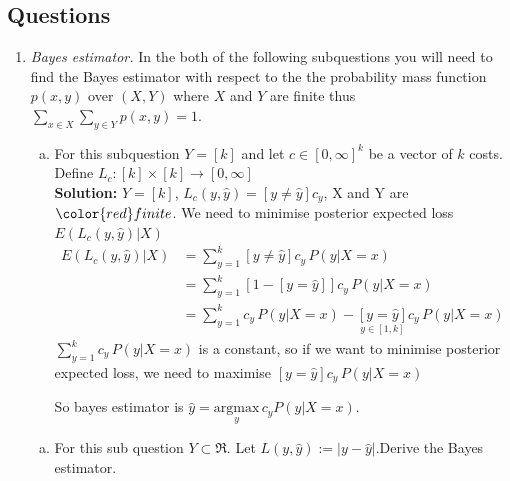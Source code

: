 \documentclass[A4,12pt]{article}
\begin{document}
\subsection{Questions}
\begin{enumerate}[6.]
    \item \textit{Bayes estimator.} In the both of the following subquestions you will need to find the Bayes estimator with respect to the the probability mass function $p(x,y)$ over $(X,Y)$ where $X$ and $Y$ are finite thus $\sum_{x\in X}^{}\sum_{y\in Y}^{}p(x,y)=1$.
    \begin{enumerate}[(a)]
       \item For this subquestion $Y=[k]$ and let $c \in [0,\infty]^k$ be a vector of $k$ costs. Define $L_c : [k]\times [k] \rightarrow [0,\infty]$\\

        \textbf{Solution:}
        $Y=[k]$, $L_c(y,\hat{y})=[y\neq\hat{y}]c_y$, X and Y are $\color{red}finite$.
       We need to minimise posterior expected loss $E\left(L_c(y,\hat{y} )| X\right)$
       \begin{equation}
       \begin{aligned}
       E\left(L_c(y,\hat{y})|X\right)&=\sum_{y=1}^{k}\left[y\neq\hat{y}\right]c_y\, P(y|X=x)\\
       &= \sum_{y=1}^{k}\left[1-[y=\hat{y}]\right] c_y\,P(y|X=x)\\
       &=\sum_{y=1}^{k}c_y\,P(y|X=x)-\underset{y\in [1,k]}{[y=\hat{y}]}c_y\,P(y|X=x)
       \end{aligned}
       \end{equation}
       $\sum_{y=1}^{k}c_y\,P(y|X=x)$ is a constant, so if we want to minimise posterior expected loss, we need to maximise $[y=\hat{y}]c_y\,P(y|X=x)$

       \quad So  bayes estimator is $\hat{y}=\underset{y}{\mathrm{argmax}}\,c_y P(y|X=x)$.

       \end{enumerate}
       \begin{enumerate}[(b)]
       \item For this sub question $Y\subset\Re$. Let $L(y,\hat{y}):=|y-\hat{y}|$.Derive the Bayes estimator.\\


\end{enumerate}
\end{enumerate}
\end{document}
